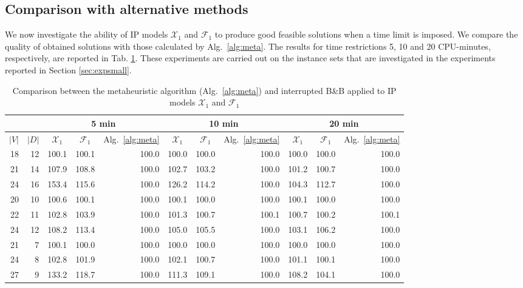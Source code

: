 \subsection{Comparison with alternative methods}
We now investigate the ability of IP models $\mathcal{X}_1$ and $\mathcal{F}_1$ to produce good feasible solutions when a time limit is imposed.
We compare the quality of obtained solutions with those calculated by Alg.\ \ref{alg:meta}.
The results for time restrictions 5, 10 and 20 CPU-minutes, respectively, are reported in Tab. \ref{tab:metamod}.
These experiments are carried out on the instance sets that are investigated in the experiments reported in Section \ref{sec:expsmall}.

\begin{table}[]
\centering
\setlength{\tabcolsep}{6pt} %
\renewcommand{\arraystretch}{1.4} %
\begin{tabular}{rrrrrrrrrrr}
\multicolumn{1}{l}{}      & \multicolumn{1}{l}{}      & \multicolumn{3}{c}{5 min}  & \multicolumn{3}{c}{10 min} & \multicolumn{3}{c}{20 min}     \\\hline
\multicolumn{1}{l}{$|V|$} & \multicolumn{1}{l}{$|D|$} & \multicolumn{1}{c}{$\mathcal{X}_1$} & \multicolumn{1}{c}{$\mathcal{F}_1$} & \multicolumn{1}{c}{Alg.\ \ref{alg:meta}} & \multicolumn{1}{c}{$\mathcal{X}_1$} & \multicolumn{1}{c}{$\mathcal{F}_1$} & \multicolumn{1}{c}{Alg.\ \ref{alg:meta}} & \multicolumn{1}{c}{$\mathcal{X}_1$} & \multicolumn{1}{c}{$\mathcal{F}_1$} & \multicolumn{1}{c}{Alg.\ \ref{alg:meta}} \\
\hline
18  & 12   &100.1&100.1&100.0&100.0&100.0&100.0&100.0&100.0&100.0\\
21  & 14   &107.9&108.8&100.0&102.7&103.2&100.0&101.2&100.7&100.0\\
24  & 16   &153.4&115.6&100.0&126.2&114.2&100.0&104.3&112.7&100.0\\     
\hline
20  & 10   &100.6&100.1&100.0&100.1&100.0&100.0&100.1&100.0&100.0\\
22  & 11   &102.8&103.9&100.0&101.3&100.7&100.1&100.7&100.2&100.1\\
24  & 12   &108.2&113.4&100.0&105.0&105.5&100.0&103.1&106.2&100.0\\                               
\hline
21  & 7    &100.1&100.0&100.0&100.0&100.0&100.0&100.0&100.0&100.0\\
24  & 8    &102.8&101.9&100.0&102.1&100.7&100.0&101.1&100.1&100.0\\
27  & 9    &133.2&118.7&100.0&111.3&109.1&100.0&108.2&104.1&100.0                                  
\end{tabular}
\caption{Comparison between the metaheuristic algorithm (Alg.\ \ref{alg:meta}) and interrupted B\&B applied to IP models $\mathcal{X}_1$ and $\mathcal{F}_1$}
\label{tab:metamod}
\end{table}

